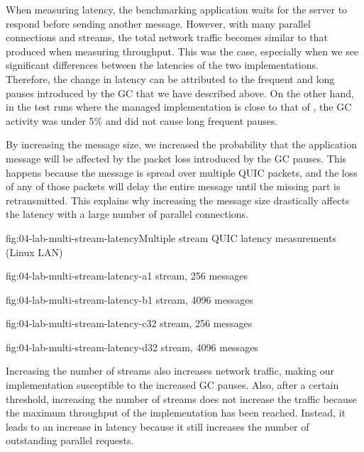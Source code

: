 When measuring latency, the benchmarking application waits for the server to respond before sending
another message. However, with many parallel connections and streams, the total network traffic
becomes similar to that produced when measuring throughput. This was the case, especially when we
see significant differences between the latencies of the two implementations. Therefore, the change
in latency can be attributed to the frequent and long pauses introduced by the GC that we have
described above. On the other hand, in the test runs where the managed implementation is close to
that of \libmsquic{}, the GC activity was under 5\% and did not cause long frequent pauses.

By increasing the message size, we increased the probability that the application message will be
affected by the packet loss introduced by the GC pauses. This happens because the message is spread
over multiple QUIC packets, and the loss of any of those packets will delay the entire message until
the missing part is retransmitted. This explains why increasing the message size drastically affects
the latency with a large number of parallel connections.

\begin{myFigure}{fig:04-lab-multi-stream-latency}{Multiple stream QUIC latency measurements (Linux LAN)}
\begin{mySubfigure}{0.49\linewidth}{fig:04-lab-multi-stream-latency-a}{1 stream, \SI{256}{\byte} messages}
\footnotesize

\end{mySubfigure}
\begin{mySubfigure}{0.49\linewidth}{fig:04-lab-multi-stream-latency-b}{1 stream, \SI{4096}{\byte} messages}
\footnotesize

\end{mySubfigure}

\begin{mySubfigure}{0.49\linewidth}{fig:04-lab-multi-stream-latency-c}{32 stream, \SI{256}{\byte} messages}
\footnotesize

\end{mySubfigure}
\begin{mySubfigure}{0.49\linewidth}{fig:04-lab-multi-stream-latency-d}{32 stream, \SI{4096}{\byte} messages}
\footnotesize

\end{mySubfigure}
\end{myFigure}

Increasing the number of streams also increases network traffic, making our implementation
susceptible to the increased GC pauses. Also, after a certain threshold, increasing the number of
streams does not increase the traffic because the maximum throughput of the implementation has been
reached. Instead, it leads to an increase in latency because it still increases the number of
outstanding parallel requests.

